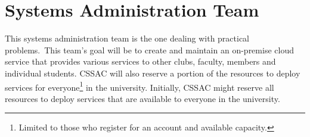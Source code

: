 \documentclass[11pt,twocolumn,oneside]{book}
\begin{document}
    \section{\large Systems Administration Team}\label{sec:the-systems-administration-team}
    This systems administration team is the one dealing with practical problems.\ This team's goal will be to create
    and maintain an on-premise cloud service that provides various services to other clubs, faculty, members and
    individual students.
    CSSAC will also reserve a portion of the resources to deploy services for
    everyone\footnote{Limited to those who register for an account and available capacity.} in the university.
    Initially, CSSAC might reserve all resources to deploy services that are available to everyone in the university.
\end{document}
